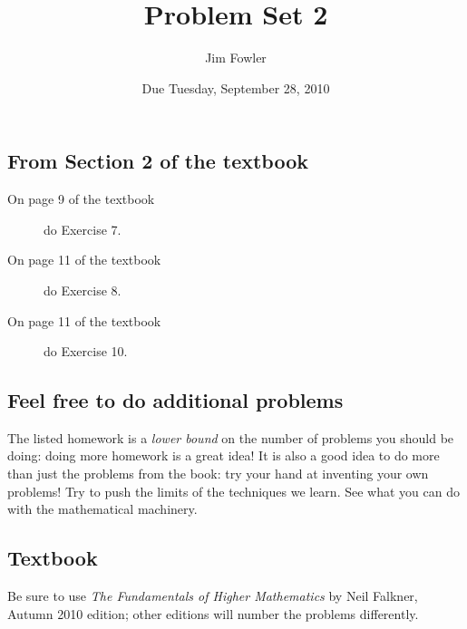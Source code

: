 \documentclass[12pt]{handout}
\author{Jim Fowler}
\title{Problem Set 2}
\date{Due Tuesday, September 28, 2010}
\begin{document}
\maketitle










\subsection*{From Section 2 of the textbook}



\begin{description}

\item[On page 9 of the textbook] do Exercise 7.

\item[On page 11 of the textbook] do Exercise 8.

\item[On page 11 of the textbook] do Exercise 10.

\end{description}









\subsection*{Feel free to do additional problems}
The listed homework is a \textit{lower bound} on the number of
problems you should be doing: doing more homework is a great idea!  It
is also a good idea to do more than just the problems from the book:
try your hand at inventing your own problems!  Try to push the limits
of the techniques we learn.  See what you can do with the mathematical
machinery.



\subsection*{Textbook}
Be sure to use \textit{The Fundamentals of Higher Mathematics} by Neil Falkner, Autumn 2010 edition; other editions will number the problems differently.
\end{document}
